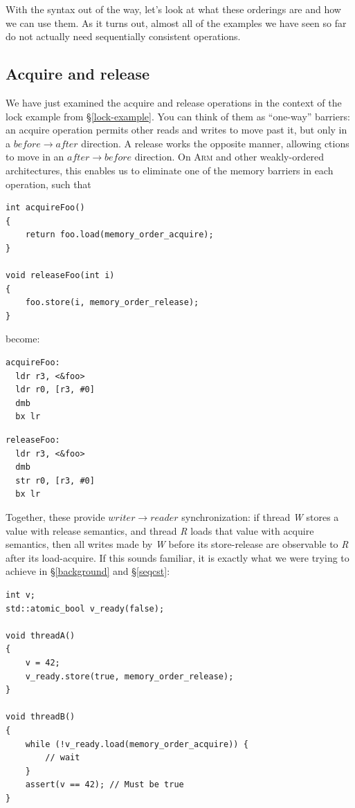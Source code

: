 \documentclass[fontsize=10pt, oneside]{scrartcl}
\newcommand{\codesize}{\fontsize{\bodyfontsize}{\bodybaselineskip}}
\newcommand{\secref}[1]{\hyperref[#1]{\textsc{\S}\ref*{#1}}}
\newenvironment{colfigure}
  {\par\vspace{1\baselineskip minus 0.5\baselineskip}\noindent\minipage{\linewidth}}
  {\endminipage\vspace{1\baselineskip minus 0.7\baselineskip}}
\begin{document}
With the syntax out of the way,
let's look at what these orderings are and how we can use them.
As it turns out, almost all of the examples we have seen so far do not actually need sequentially consistent operations.

\subsection{Acquire and release}

We have just examined the acquire and release operations in the context of the lock example from \secref{lock-example}.
You can think of them as ``one-way'' barriers: an acquire operation permits other reads and writes to move past it,
but only in a $before \to after$ direction.
A release works the opposite manner, allowing ctions to move in an $after \to before$ direction.
On \textsc{Arm} and other weakly-ordered architectures, this enables us to eliminate one of the memory barriers in each operation,
such that

\begin{colfigure}
\begin{verbatim}
int acquireFoo()
{
    return foo.load(memory_order_acquire);
}

void releaseFoo(int i)
{
    foo.store(i, memory_order_release);
}
\end{verbatim}
\end{colfigure}
become:
\begin{colfigure}
\begin{minipage}{0.45\linewidth}
\begin{lstlisting}[language={[ARM]Assembler}]
acquireFoo:
  ldr r3, <&foo>
  ldr r0, [r3, #0]
  dmb
  bx lr
\end{lstlisting}
\end{minipage}
\begin{minipage}{0.45\linewidth}
\begin{lstlisting}[language={[ARM]Assembler}]
releaseFoo:
  ldr r3, <&foo>
  dmb
  str r0, [r3, #0]
  bx lr
\end{lstlisting}
\end{minipage}
\end{colfigure}

Together, these provide $writer \to reader$ synchronization:
if thread \textit{W} stores a value with release semantics,
and thread \textit{R} loads that value with acquire semantics,
then all writes made by \textit{W} before its store-release are observable to \textit{R} after its load-acquire.
If this sounds familiar, it is exactly what we were trying to achieve in
\secref{background} and \secref{seqcst}:
\begin{colfigure}
\begin{verbatim}
int v;
std::atomic_bool v_ready(false);

void threadA()
{
    v = 42;
    v_ready.store(true, memory_order_release);
}

void threadB()
{
    while (!v_ready.load(memory_order_acquire)) {
        // wait
    }
    assert(v == 42); // Must be true
}
\end{verbatim}
\end{colfigure}
\end{document}
